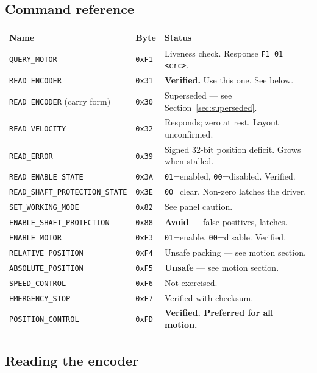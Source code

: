 \documentclass[11pt,letterpaper]{article}
\begin{document}
\subsection{Command reference}
\begin{longtable}{lll}
\toprule
\textbf{Name} & \textbf{Byte} & \textbf{Status} \\ \midrule
\endhead
\texttt{QUERY\_MOTOR}                & \texttt{0xF1} & Liveness check. Response \texttt{F1 01 <crc>}. \\
\texttt{READ\_ENCODER}               & \texttt{0x31} & \textbf{Verified.} Use this one. See below. \\
\texttt{READ\_ENCODER} (carry form)  & \texttt{0x30} & Superseded --- see Section~\ref{sec:superseded}. \\
\texttt{READ\_VELOCITY}              & \texttt{0x32} & Responds; zero at rest. Layout unconfirmed. \\
\texttt{READ\_ERROR}                 & \texttt{0x39} & Signed 32-bit position deficit. Grows when stalled. \\
\texttt{READ\_ENABLE\_STATE}         & \texttt{0x3A} & \texttt{01}=enabled, \texttt{00}=disabled. Verified. \\
\texttt{READ\_SHAFT\_PROTECTION\_STATE} & \texttt{0x3E} & \texttt{00}=clear. Non-zero latches the driver. \\
\texttt{SET\_WORKING\_MODE}          & \texttt{0x82} & See panel caution. \\
\texttt{ENABLE\_SHAFT\_PROTECTION}   & \texttt{0x88} & \textbf{Avoid} --- false positives, latches. \\
\texttt{ENABLE\_MOTOR}               & \texttt{0xF3} & \texttt{01}=enable, \texttt{00}=disable. Verified. \\
\texttt{RELATIVE\_POSITION}          & \texttt{0xF4} & Unsafe packing --- see motion section. \\
\texttt{ABSOLUTE\_POSITION}          & \texttt{0xF5} & \textbf{Unsafe} --- see motion section. \\
\texttt{SPEED\_CONTROL}              & \texttt{0xF6} & Not exercised. \\
\texttt{EMERGENCY\_STOP}             & \texttt{0xF7} & Verified with checksum. \\
\texttt{POSITION\_CONTROL}           & \texttt{0xFD} & \textbf{Verified. Preferred for all motion.} \\
\bottomrule
\end{longtable}

\subsection{Reading the encoder}
\label{sec:encoder}
\end{document}
